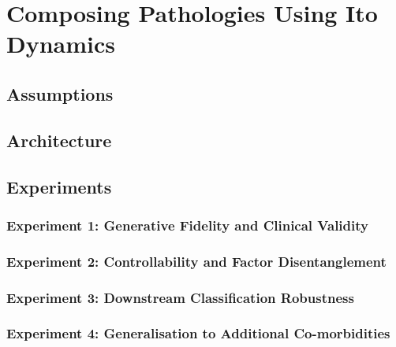 \section{Composing Pathologies Using Ito Dynamics}

\subsection{Assumptions}
\subsection{Architecture}
\subsection{Experiments}
\subsubsection{Experiment 1: Generative Fidelity and Clinical Validity}

\subsubsection{Experiment 2: Controllability and Factor Disentanglement}

\subsubsection{Experiment 3: Downstream Classification Robustness}

\subsubsection{Experiment 4: Generalisation to Additional Co-morbidities}
